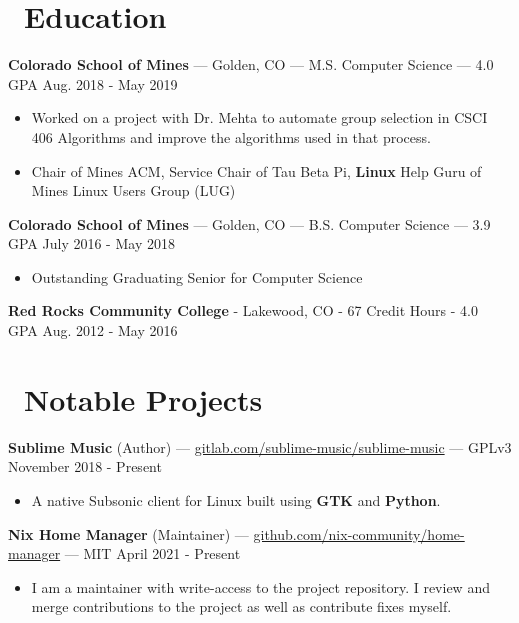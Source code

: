 \documentclass[10pt,letterpaper]{article}
\begin{document}
\section*{\faBook\ Education}
\textbf{Colorado School of Mines} --- Golden, CO --- M.S. Computer Science --- 4.0 GPA
\hfill Aug. 2018 - May 2019
\begin{itemize}
    \item Worked on a project with Dr. Mehta to automate group selection in
        CSCI 406 Algorithms and improve the algorithms used in that process.
    \item Chair of Mines ACM, Service Chair of Tau Beta Pi, \textbf{Linux} Help
        Guru of Mines Linux Users Group (LUG)
\end{itemize}

\textbf{Colorado School of Mines} --- Golden, CO --- B.S. Computer Science --- 3.9 GPA
\hfill July 2016 - May 2018
\begin{itemize}
    \item Outstanding Graduating Senior for Computer Science
\end{itemize}

\vspace{2pt}
\textbf{Red Rocks Community College} - Lakewood, CO - 67 Credit Hours - 4.0 GPA
\hfill Aug. 2012 - May 2016

\section*{\faCode\ Notable Projects}
\textbf{Sublime Music} (Author) ---
\href{https://gitlab.com/sublime-music/sublime-music}{gitlab.com/sublime-music/sublime-music}
--- GPLv3 \hfill November 2018 - Present
\begin{itemize}
    \item A native Subsonic client for Linux built using \textbf{GTK} and
        \textbf{Python}.
\end{itemize}

\textbf{Nix Home Manager} (Maintainer) ---
\href{https://github.com/nix-community/home-manager}{github.com/nix-community/home-manager}
--- MIT \hfill April 2021 - Present
\begin{itemize}
    \item I am a maintainer with write-access to the project repository. I
        review and merge contributions to the project as well as contribute
        fixes myself.

\end{itemize}
\end{document}
